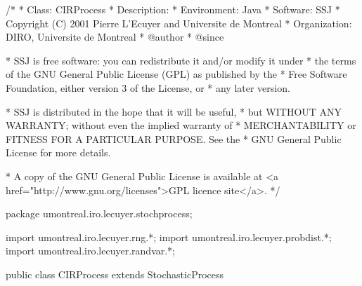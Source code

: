 \begin{code}
\begin{hide}
/*
 * Class:        CIRProcess
 * Description:  
 * Environment:  Java
 * Software:     SSJ 
 * Copyright (C) 2001  Pierre L'Ecuyer and Universite de Montreal
 * Organization: DIRO, Universite de Montreal
 * @author       
 * @since

 * SSJ is free software: you can redistribute it and/or modify it under
 * the terms of the GNU General Public License (GPL) as published by the
 * Free Software Foundation, either version 3 of the License, or
 * any later version.

 * SSJ is distributed in the hope that it will be useful,
 * but WITHOUT ANY WARRANTY; without even the implied warranty of
 * MERCHANTABILITY or FITNESS FOR A PARTICULAR PURPOSE.  See the
 * GNU General Public License for more details.

 * A copy of the GNU General Public License is available at
   <a href="http://www.gnu.org/licenses">GPL licence site</a>.
 */
\end{hide}
package umontreal.iro.lecuyer.stochprocess;\begin{hide}
import umontreal.iro.lecuyer.rng.*;
import umontreal.iro.lecuyer.probdist.*;
import umontreal.iro.lecuyer.randvar.*;

\end{hide}

public class CIRProcess extends StochasticProcess \begin{hide} {
    private RandomStream stream;
    protected ChiSquareNoncentralGen gen;
    protected double alpha,
                     beta,
                     sigma,
                     nu;     // number of degrees of freedom
    // Precomputed values
    protected double[] parc,
                       parlam;
\end{hide}
\end{code}
